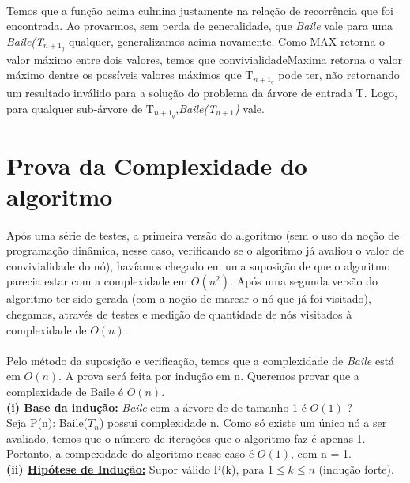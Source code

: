 \documentclass[a4paper]{article}
\begin{document}
\paragraph{}Temos que a função acima culmina justamente na relação de recorrência que foi encontrada. Ao provarmos, sem perda de generalidade, que \emph{Baile} vale para uma \emph{Baile(T$_{n+1_q}$} qualquer, generalizamos acima novamente. Como MAX retorna o valor máximo entre dois valores, temos que convivialidadeMaxima retorna o valor máximo dentre os possíveis valores máximos que T$_{n+1_q}$ pode ter, não retornando um resultado inválido para a solução do problema da árvore de entrada T. Logo, para qualquer sub-árvore de T$_{n+1_q}$,\emph{Baile(T$_{n+1}$)} vale.
\newpage

\section{Prova da Complexidade do algoritmo}
\paragraph{}Após uma série de testes, a primeira versão do algoritmo (sem o uso da noção de programação dinâmica, nesse caso, verificando se o algoritmo já avaliou o valor de convivialidade do nó), havíamos chegado em uma suposição de que o algoritmo parecia estar com a complexidade em $O(n^2)$. Após uma segunda versão do algoritmo ter sido gerada (com a noção de marcar o nó que já foi visitado), chegamos, através de testes e medição de quantidade de nós visitados à complexidade de $O(n)$.\\
\paragraph{}Pelo método da suposição e verificação, temos que a complexidade de \emph{Baile} está em $O(n)$. A prova será feita por indução em n. Queremos provar que a complexidade de Baile é $O(n)$.\\

\textbf{(i) \underline{Base da indução:}} \emph{Baile} com a árvore de de tamanho 1 é $O(1)$ ?\\
\qquad Seja P(n): Baile($T_n$) possui complexidade n. Como só existe um único nó a ser avaliado, temos que o número de iterações que o algoritmo faz é apenas 1. Portanto, a compexidade do algoritmo nesse caso é $O(1)$, com n = 1.\\

\textbf{(ii) \underline{Hipótese de Indução:}} Supor válido P(k), para $1\leq k \leq n$ (indução forte).\\
\end{document}
